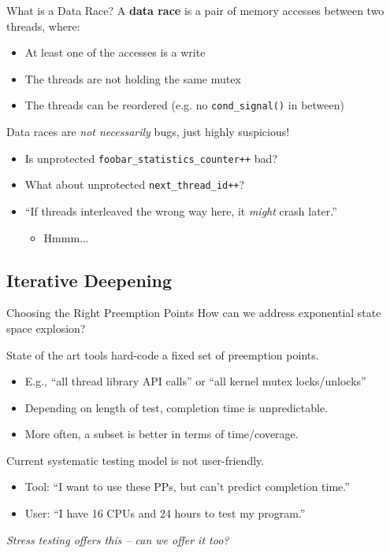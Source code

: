 \documentclass[xcolor=dvipsnames]{beamer}
\begin{document}
\begin{frame}{What is a Data Race?}
	A {\bf data race} is a pair of memory accesses between two threads, where:
	\begin{itemize}
		\item At least one of the accesses is a write
		\item The threads are not holding the same mutex
		\item The threads can be reordered (e.g. no \texttt{cond\_signal()} in between)
	\end{itemize}
	\pause
	\linegap

	Data races are {\em not necessarily} bugs, just highly suspicious!
	\begin{itemize}
		\item Is unprotected {\tt foobar\_statistics\_counter++} bad?
		\item What about unprotected {\tt next\_thread\_id++}?
		\item ``If threads interleaved the wrong way here, it {\em might} crash later.''
		\begin{itemize}
			\item Hmmm...
		\end{itemize}
	\end{itemize}
\end{frame}


\subsection{Iterative Deepening}

\begin{frame}{Choosing the Right Preemption Points}
	How can we address exponential state space explosion?
	\pause
	\linegap

	State of the art tools hard-code a fixed set of preemption points.
	\begin{itemize}
		\item E.g., ``all thread library API calls'' or ``all kernel mutex locks/unlocks''
		\item Depending on length of test, completion time is unpredictable.
		\item More often, a subset is better in terms of time/coverage. 
	\end{itemize}
	\pause
	\linegap
	Current systematic testing model is not user-friendly.
	\begin{itemize}
		\item Tool: ``I want to use these PPs, but can't predict completion time.''
		\item User: ``I have 16 CPUs and 24 hours to test my program.''
	\end{itemize}
	\linegap
	{\em Stress testing offers this -- can we offer it too?}
\end{frame}
\end{document}
